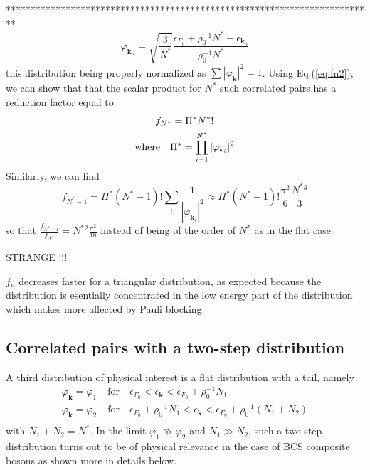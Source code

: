 \documentclass[aps,prb,preprint,groupedaddress,amsmath]{revtex4}
\newcommand{\vk}{\ensuremath{\mathbf{k}}}
\begin{document}
**************************************************************************
\begin{equation}
 \varphi_{\vk_n}=\sqrt{\frac{3}{N^*}}\frac{\epsilon_{F_0}+\rho_0^{-1}N^*-\epsilon_{\vk_n}}{\rho_0^{-1}N^*}
\end{equation}
this distribution being properly normalized as $\sum|\varphi_\vk|^2=1$.  Using Eq.(\ref{eq:fn2}), we can show that that the scalar product for $N^*$ such correlated pairs  has a reduction factor equal to
\begin{gather}
f_{N^*}=\Pi^*N^*!\\
\mbox{where}\quad \Pi^*=\prod_{i=1}^{N^*}|\varphi_{k_i} |^2\notag
\end{gather}
Similarly, we can find
\begin{equation}
 f_{N^*-1}=\Pi^*(N^*-1)!\sum_{i}\frac{1}{|\varphi_{\vk_i}|^2}\approx\Pi^*(N^*-1)!\frac{\pi^2}{6}\frac{N^*{}^3}{3}
\end{equation}
so that $\frac{f_{N^*-1}}{f_{N^*}}=N^*{}^2\frac{\pi^2}{18}$ instead of being of the order of $N^*$ as in the flat case: 

STRANGE !!!

 $f_n$ decreases faster for a triangular distribution, as expected because the distribution is esentially concentrated in the low energy part of the distribution which makes more affected by Pauli blocking.   





\subsection{Correlated pairs with a two-step distribution}
A third distribution of physical interest is a flat distribution with a tail, namely
\begin{equation}
 \begin{split}
  \varphi_\vk=\varphi_1&\; \mbox{for}\quad{}\epsilon_{F_0}<\epsilon_\vk<\epsilon_{F_0}+\rho_0^{-1}N_1\\
  \varphi_\vk=\varphi_2&\; \mbox{for}\quad{}\epsilon_{F_0}+\rho_0^{-1}N_1<\epsilon_\vk<\epsilon_{F_0}+\rho_0^{-1}(N_1+N_2)\\
 \end{split}
\end{equation}
with $N_1+N_2=N^*$. In the limit $\varphi_1\gg\varphi_2$ and $N_1\gg{}N_2$, such a two-step distribution turns out to be of physical relevance in the case of BCS composite bosons as shown more in details below. 
\end{document}
